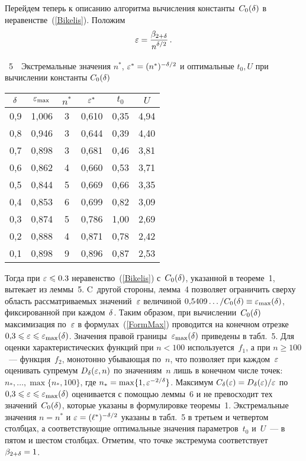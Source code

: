 \begin{multicols}{2}
\medskip

Перейдем теперь к описанию алгоритма вычисления константы~$C_0(\delta)$
в неравенстве~(\ref{Bikelis}). Положим
$$
\varepsilon = \displaystyle\frac{\displaystyle \beta_{2+\delta}\mathstrut}{\displaystyle n^{\delta/2}\mathstrut}\,.
$$


\noindent
\begin{center} %
\vspace*{-8pt}

\noindent
\parbox{79mm}{{\tablename~5}\ \ \small{Экстремальные значения
$n^*$, $\varepsilon^*=(n^*)^{-\delta/2}$ и оптимальные $t_0,U$ при вычислении
константы $C_0(\delta)$}}

\vspace*{2ex}

{\small 
\tabcolsep=11pt
\begin{tabular}{|c|c|c|c|c|c|}
  \hline
  $\delta$ & $\varepsilon_{\max}$ & $n^*$ & $\varepsilon^*$ & $t_0$ & $U$\\
  \hline 
  0,9& 1,006& 3& 0,610& 0,35& 4,94\\
  0,8& 0,946& 3& 0,644& 0,39& 4,40\\
  0,7& 0,898& 3& 0,681& 0,46& 3,81\\
  0,6& 0,862& 4& 0,660& 0,53& 3,71\\
  0,5& 0,844& 5& 0,669& 0,66& 3,35\\
  0,4& 0,853& 6& 0,699& 0,82& 3,09\\
  0,3& 0,874& 5& 0,786& 1,00& 2,69\\
  0,2& 0,888& 4& 0,871& 0,78& 2,42\\
  0,1& 0,898& 9& 0,896& 0,87& 2,53\\
  \hline
\end{tabular}
}
\end{center}

\addtocounter{table}{1}

\vspace*{12pt}


\noindent
Тогда при $\varepsilon\leqslant0.3$ неравенство~(\ref{Bikelis}) с~$C_0(\delta)$,
указанной в теореме~1, вытекает из
леммы~5. C~другой стороны, лемма~4
позволяет ограничить сверху область рассматриваемых значений~$\varepsilon$
величиной $0{,}5409\ldots/C_0(\delta)\equiv\varepsilon_{\max}(\delta)$, фиксированной
при каждом~$\delta$. Таким образом, при вычислении~$C_0(\delta)$
максимизация по~$\varepsilon$ в формулах~(\ref{FormMax}) проводится на
конечном отрезке $0{,}3\leqslant\varepsilon\leqslant\varepsilon_{\max}(\delta)$. Значения правой
границы~$\varepsilon_{\max}(\delta)$ приведены в
табл.~5. Для оценки
характеристических функций при $n<100$ используется~$f_1$, а при
$n\ge100$~--- функция~$f_2$, монотонно убывающая по~$n$, что
позволяет при каждом~$\varepsilon$ оценивать супремум $D_\delta(\varepsilon,n)$ по
значениям~$n$ лишь в конечном числе точек:
$n_*,\ldots,\max\{n_*,100\}$, где $n_*=\max\{1,\varepsilon^{-2/\delta}\}$.
Максимум $C_\delta(\varepsilon)=D_\delta(\varepsilon)/\varepsilon$ по
$0{,}3\leqslant\varepsilon\leqslant\varepsilon_{\max}(\delta)$ оценивается  с помощью
леммы~6 и не превосходит тех значений~$C_0(\delta)$,
которые указаны в формулировке теоремы~1.
Экстремальные значения $n=n^*$ и $\varepsilon=(\ell^*)^{-\delta/2}$ указаны в
табл.~5 в третьем и четвертом
столбцах, а соответствующие оптимальные значения параметров~$t_0$ и~$U$~--- 
в пятом и шестом столбцах. Отметим, что точке экстремума соответствует $\beta_{2+\delta}=1$.



\end{multicols}
